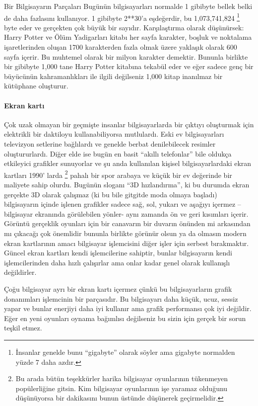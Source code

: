 \documentclass[10pt,a5paper]{book}
\begin{document}
\begin{section}{Bir Bilgisayarın Parçaları}
Bugünün bilgisayarları normalde 1 gibibyte bellek belki de daha fazlasını kullanıyor. 1 gibibyte 2**30'a eşdeğerdir, bu 1,073,741,824 
\footnote{İnsanlar genelde bunu “gigabyte” olarak söyler ama gigabyte normalden yüzde 7 daha azdır.}
byte eder ve gerçekten çok büyük bir sayıdır. Karşılaştırma olarak düşünürsek: Harry Potter ve Ölüm Yadigarları kitabı her sayfa karakter, boşluk ve noktalama işaretlerinden oluşan 1700 karakterden fazla olmak üzere yaklaşık olarak 600 sayfa içerir. Bu muhtemel olarak bir milyon karakter demektir. Bununla birlikte bir gibibyte 1,000 tane Harry Potter kitabına tekabül eder ve eğer sadece genç bir büyücünün kahramanlıkları ile ilgili değilseniz 1,000 kitap inanılmaz bir kütüphane oluşturur.
\paragraph{Ekran kartı}{Çok uzak olmayan bir geçmişte insanlar bilgisayarlarda bir çıktıyı oluşturmak için elektrikli bir daktiloyu kullanabiliyorsa mutlulardı. Eski ev bilgisayarları televizyon setlerine bağlılardı ve genelde berbat denilebilecek resimler oluştururlardı. Diğer elde ise bugün en basit “akıllı telefonlar” bile oldukça etkileyici grafikler sunuyorlar ve şu anda kullanılan kişisel bilgisayarlardaki ekran kartları 1990' larda 
\footnote{Bu arada bütün teşekkürler harika bilgisayar oyunlarının tükenmeyen popülerliğine gitsin. Kim bilgisayar oyunlarının işe yaramaz olduğunu düşünüyorsa bir dakikasını bunun üstünde düşünerek geçirmelidir.}
pahalı bir spor arabaya ve küçük bir ev değerinde bir maliyete sahip olurdu. Bugünün sloganı “3D hızlandırma”, ki bu durumda ekran gerçekte 3D olarak çalışmaz (ki bu bile gitgitde moda olmaya başladı) bilgisayarın içinde işlenen grafikler sadece sağ, sol, yukarı ve aşağıyı içermez – bilgisayar ekranında görülebilen yönler- aynı zamanda ön ve geri kısımları içerir. Görüntü gerçeklik oyunları için bir canavarın bir duvarın önünden mi arkasından mı çıkacağı çok önemlidir bununla birlikte görünür olsun ya da olmasın modern ekran kartlarının amacı bilgisayar işlemcisini diğer işler için serbest bırakmaktır.  Güncel ekran kartları kendi işlemcilerine sahiptir, bunlar bilgisayarın kendi işlemcilerinden daha hızlı çalışırlar ama onlar kadar genel olarak kullanışlı değildirler.}

Çoğu bilgisayar ayrı bir ekran kartı içermez çünkü bu bilgisayarların grafik donanımları işlemcinin bir parçasıdır. Bu bilgisayarı daha küçük, ucuz, sessiz yapar ve bunlar enerjiyi daha iyi kullanır ama grafik performansı çok iyi değildir. Eğer en yeni oyunları oynama bağımlısı değilseniz bu sizin için gerçek bir sorun teşkil etmez.

\end{section}
\end{document}
